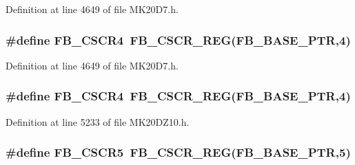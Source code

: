 Definition at line 4649 of file M\+K20\+D7.\+h.

\subsubsection[{\texorpdfstring{F\+B\+\_\+\+C\+S\+C\+R4}{FB_CSCR4}}]{\setlength{\rightskip}{0pt plus 5cm}\#define F\+B\+\_\+\+C\+S\+C\+R4~{\bf F\+B\+\_\+\+C\+S\+C\+R\+\_\+\+R\+EG}({\bf F\+B\+\_\+\+B\+A\+S\+E\+\_\+\+P\+TR},4)}\hypertarget{group___f_b___register___accessor___macros_gab771a3e18c902983f93e07239d58e2fc}{}\label{group___f_b___register___accessor___macros_gab771a3e18c902983f93e07239d58e2fc}


Definition at line 4649 of file M\+K20\+D7.\+h.

\subsubsection[{\texorpdfstring{F\+B\+\_\+\+C\+S\+C\+R4}{FB_CSCR4}}]{\setlength{\rightskip}{0pt plus 5cm}\#define F\+B\+\_\+\+C\+S\+C\+R4~{\bf F\+B\+\_\+\+C\+S\+C\+R\+\_\+\+R\+EG}({\bf F\+B\+\_\+\+B\+A\+S\+E\+\_\+\+P\+TR},4)}\hypertarget{group___f_b___register___accessor___macros_gab771a3e18c902983f93e07239d58e2fc}{}\label{group___f_b___register___accessor___macros_gab771a3e18c902983f93e07239d58e2fc}


Definition at line 5233 of file M\+K20\+D\+Z10.\+h.

\subsubsection[{\texorpdfstring{F\+B\+\_\+\+C\+S\+C\+R5}{FB_CSCR5}}]{\setlength{\rightskip}{0pt plus 5cm}\#define F\+B\+\_\+\+C\+S\+C\+R5~{\bf F\+B\+\_\+\+C\+S\+C\+R\+\_\+\+R\+EG}({\bf F\+B\+\_\+\+B\+A\+S\+E\+\_\+\+P\+TR},5)}\hypertarget{group___f_b___register___accessor___macros_gad2feac4ee9e7a92e473f726b0cecfd1a}{}\label{group___f_b___register___accessor___macros_gad2feac4ee9e7a92e473f726b0cecfd1a}


